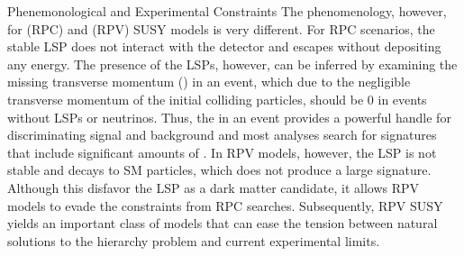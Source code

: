 \begin{section}{Phenemonological and Experimental Constraints}
The phenomenology, however, for \RPC (RPC) and \RPV (RPV) SUSY models is very different.
For RPC scenarios, the stable LSP does not interact with the detector and escapes without depositing any energy.
The presence of the LSPs, however, can be inferred by examining the missing transverse momentum (\MET) in an event, which due to the negligible transverse momentum of the initial colliding particles, should be 0 in events without LSPs or neutrinos.
Thus, the \MET in an event provides a powerful handle for discriminating signal and background and most analyses search for signatures that include significant amounts of \MET.
In RPV models, however, the LSP is not stable and decays to SM particles, which does not produce a large \MET signature.
Although this disfavor the LSP as a dark matter candidate, it allows RPV models to evade the constraints from RPC searches.
Subsequently, RPV SUSY yields an important class of models that can ease the tension between natural solutions to the hierarchy problem and current experimental limits.

\end{section}

